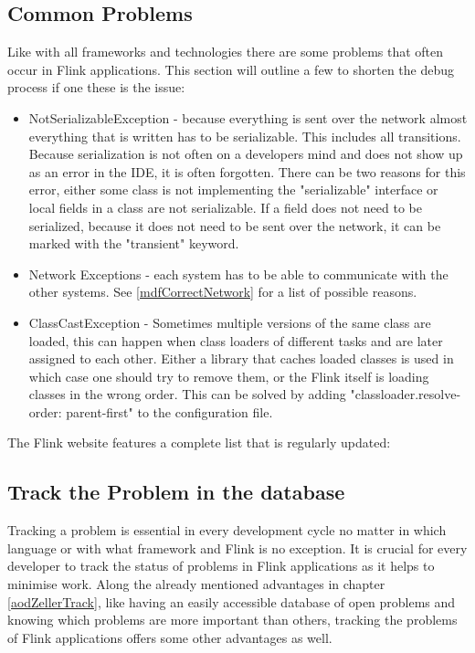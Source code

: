 \subsection{Common Problems}
Like with all frameworks and technologies there are some problems that often occur in Flink applications. This section will outline a few to shorten the debug process if one these is the issue:
\begin{itemize}
  \item NotSerializableException - because everything is sent over the network almost everything that is written has to be serializable. This includes all transitions. Because serialization is not often on a developers mind and does not show up as an error in the IDE, it is often forgotten. There can be two reasons for this error, either some class is not implementing the "serializable" interface or local fields in a class are not serializable. If a field does not need to be serialized, because it does not need to be sent over the network, it can be marked with the "transient" keyword.
  \item Network Exceptions - each system has to be able to communicate with the other systems. See \ref{mdfCorrectNetwork} for a list of possible reasons.
  \item ClassCastException - Sometimes multiple versions of the same class are loaded, this can happen when class loaders of different tasks and are later assigned to each other. Either a library that caches loaded classes is used in which case one should try to remove them, or the Flink itself is loading classes in the wrong order. This can be solved by adding "classloader.resolve-order: parent-first" to the configuration file.
\end{itemize}
The Flink website features a complete list that is regularly updated: \cite{ApacheFlinkFaq}

\subsection{Track the Problem in the database}
Tracking a problem is essential in every development cycle no matter in which language or with what framework and Flink is no exception. It is crucial for every developer to track the status of problems in Flink applications as it helps to minimise work. Along the already mentioned advantages in chapter \ref{aodZellerTrack}, like having an easily accessible database of open problems and knowing which problems are more important than others, tracking the problems of Flink applications offers some other advantages as well.

